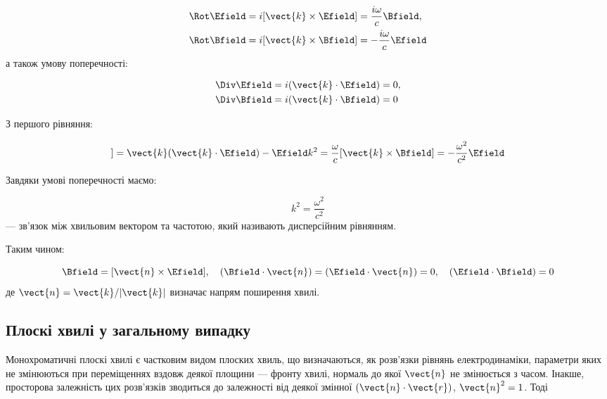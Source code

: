 \begin{align*}
\Rot\Efield &= i[\vect{k} \times \Efield] = \frac{i\omega}{c} \Bfield, \\
\Rot\Bfield &= i[\vect{k} \times \Bfield] = -\frac{i\omega}{c} \Efield
\end{align*}
а також умову поперечності:

\begin{align*}
\Div\Efield &= i(\vect{k} \cdot \Efield) = 0, \\
\Div\Bfield &= i(\vect{k} \cdot \Bfield) = 0
\end{align*}

З першого рівняння:

\begin{equation*}
[\vect{k} \times [\vect{k} \times \Efield]] = \vect{k}(\vect{k} \cdot \Efield) - \Efield k^2 = \frac{\omega}{c}[\vect{k} \times \Bfield] =
-\frac{\omega^2}{c^2} \Efield
\end{equation*}

Завдяки умові поперечності маємо:

\begin{equation*}
k^2 = \frac{\omega^2}{c^2}
\label{eq:dispersion_relation}
\end{equation*}
--- зв’язок між хвильовим вектором та частотою, який називають дисперсійним рівнянням.

Таким чином:

\begin{equation*}
\Bfield = [\vect{n} \times \Efield], \quad (\Bfield \cdot \vect{n}) = (\Efield \cdot \vect{n}) = 0, \quad (\Efield \cdot \Bfield) = 0
\label{eq:wave_properties}
\end{equation*}
де \(\vect{n} = \vect{k} / |\vect{k}|\) визначає напрям поширення хвилі.

\subsection*{Плоскі хвилі у загальному випадку}

Монохроматичні плоскі хвилі є частковим видом плоских хвиль, що визначаються, як розв’язки рівнянь електродинаміки, параметри яких не
змінюються при переміщеннях вздовж деякої площини --- фронту хвилі, нормаль до якої \(\vect{n}\) не змінюється з часом. Інакше, просторова залежність
цих розв’язків зводиться до залежності від деякої змінної \((\vect{n} \cdot \vect{r})\), \(\vect{n}^2 = 1\). Тоді

